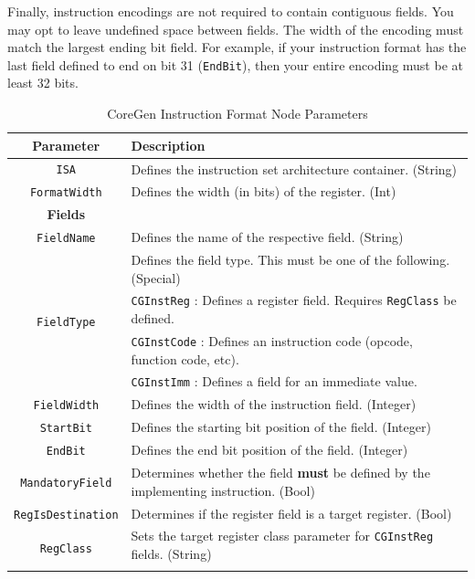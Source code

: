 \documentclass{article}
\begin{document}
Finally, instruction encodings are not required to contain contiguous fields.  You may opt to leave undefined 
space between fields.  The width of the encoding must match the largest ending bit field.  For example, if 
your instruction format has the last field defined to end on bit 31 (\texttt{EndBit}), then your entire encoding must be at least 
32 bits.   

\begin{table}[h]
\begin{center}
\caption{CoreGen Instruction Format Node Parameters}
\vspace{0.125in}
\label{tab:InstFormatParams}
\begin{tabular}{|c|l|}
\hline
\textbf{Parameter} & \textbf{Description}\\
\hline
\texttt{ISA} & Defines the instruction set architecture container. (String)\\
\hline
\texttt{FormatWidth} & Defines the width (in bits) of the register. (Int)\\
\hline
\hline
\textbf{Fields} & \\
\hline
\texttt{FieldName} & Defines the name of the respective field. (String)\\
\hline
\multirow{4}{*}{\texttt{FieldType}} & Defines the field type.  This must be one of the following. (Special)\\
                                                            & \texttt{CGInstReg} : Defines a register field.  Requires \texttt{RegClass} be defined.\\
                                                            & \texttt{CGInstCode} : Defines an instruction code (opcode, function code, etc).\\
                                                            & \texttt{CGInstImm} : Defines a field for an immediate value.\\
\hline
\texttt{FieldWidth} & Defines the width of the instruction field. (Integer)\\
\hline
\texttt{StartBit} & Defines the starting bit position of the field. (Integer)\\
\hline
\texttt{EndBit} & Defines the end bit position of the field. (Integer)\\
\hline
\texttt{MandatoryField} & Determines whether the field \textbf{must} be defined by the implementing instruction. (Bool)\\
\hline
\texttt{RegIsDestination} & Determines if the register field is a target register. (Bool)\\
\hline
\multirow{2}{*}{\texttt{RegClass}} & Sets the target register class parameter for \texttt{CGInstReg} fields.  (String)\\ & \\
\hline
\end{tabular}
\end{center}
\end{table} 
\end{document}
